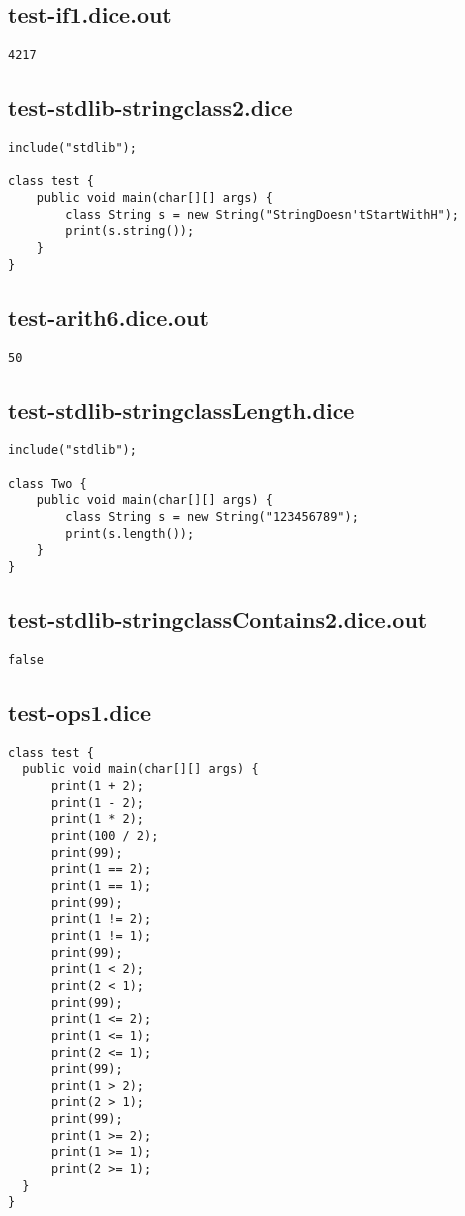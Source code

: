 \subsection{test-if1.dice.out}
\begin{verbatim}
4217
\end{verbatim}
\pagebreak
\subsection{test-stdlib-stringclass2.dice}
\begin{verbatim}
include("stdlib");

class test {
	public void main(char[][] args) {
        class String s = new String("StringDoesn'tStartWithH");
        print(s.string());
	}
}

\end{verbatim}
\pagebreak
\subsection{test-arith6.dice.out}
\begin{verbatim}
50
\end{verbatim}
\pagebreak
\subsection{test-stdlib-stringclassLength.dice}
\begin{verbatim}
include("stdlib");

class Two {
	public void main(char[][] args) {
        class String s = new String("123456789");
        print(s.length());
	}
}

\end{verbatim}
\pagebreak
\subsection{test-stdlib-stringclassContains2.dice.out}
\begin{verbatim}
false
\end{verbatim}
\pagebreak
\subsection{test-ops1.dice}
\begin{verbatim}
class test {
  public void main(char[][] args) {
      print(1 + 2);
      print(1 - 2);
      print(1 * 2);
      print(100 / 2);
      print(99);
      print(1 == 2);
      print(1 == 1);
      print(99);
      print(1 != 2);
      print(1 != 1);
      print(99);
      print(1 < 2);
      print(2 < 1);
      print(99);
      print(1 <= 2);
      print(1 <= 1);
      print(2 <= 1);
      print(99);
      print(1 > 2);
      print(2 > 1);
      print(99);
      print(1 >= 2);
      print(1 >= 1);
      print(2 >= 1);
  }
}

\end{verbatim}
\pagebreak

